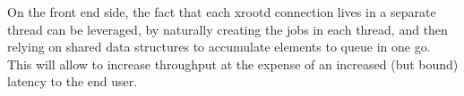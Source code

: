 On the front end side, the fact that each xrootd connection lives in a separate thread can be leveraged, by naturally creating the jobs in each thread, and then relying on shared data structures to accumulate elements to queue in one go. This will allow to increase throughput at the expense of an increased (but bound) latency to the end user.

